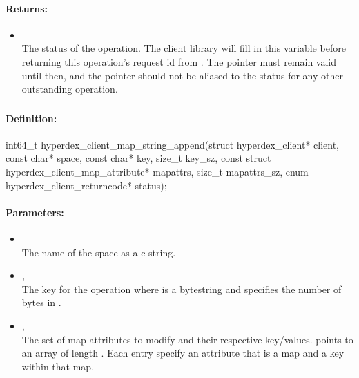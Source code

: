 \paragraph{Returns:}
\begin{itemize}[noitemsep]
\item {}\\
The status of the operation.  The client library will fill in this variable before returning this operation's request id from .  The pointer must remain valid until then, and the pointer should not be aliased to the status for any other outstanding operation.
\end{itemize}

\pagebreak
\subsubsection{}
\label{api:c:map_string_append}


\paragraph{Definition:}
\begin{ccode}
int64_t hyperdex_client_map_string_append(struct hyperdex_client* client,
        const char* space,
        const char* key, size_t key_sz,
        const struct hyperdex_client_map_attribute* mapattrs, size_t mapattrs_sz,
        enum hyperdex_client_returncode* status);
\end{ccode}

\paragraph{Parameters:}
\begin{itemize}[noitemsep]
\item {}\\
The name of the space as a c-string.
\item {}, \\
The key for the operation where  is a bytestring and  specifies the number of bytes in .
\item {}, \\
The set of map attributes to modify and their respective key/values.   points to an array of length .  Each entry specify an attribute that is a map and a key within that map.
\end{itemize}

